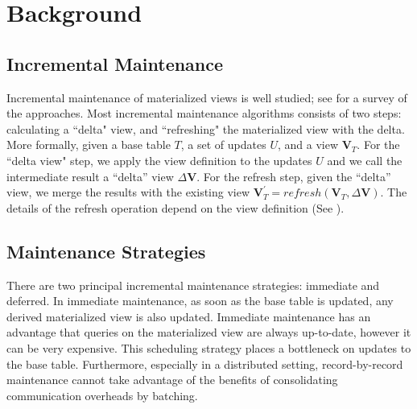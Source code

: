 \section{Background}\label{sec-background}
\vspace{-.5em}
\subsection{Incremental Maintenance}\label{subsec-inc}
Incremental maintenance of materialized views is well studied; see \cite{chirkova2011materialized} for a survey of the approaches. 
Most incremental maintenance algorithms consists of two steps: calculating a ``delta" view,
and ``refreshing" the materialized view with the delta.
More formally, given a base table $T$, a set of updates $U$,
and a view $\textbf{V}_{T}$.
For the ``delta view" step, we apply the view definition to the updates $U$ and we call
the intermediate result a ``delta'' view $\Delta\textbf{V}$.
For the refresh step, given the ``delta'' view, we merge the results with the existing
view $\textbf{V}_{T}^{'}=refresh(\textbf{V}_{T},\Delta\textbf{V})$.
The details of the refresh operation depend on the view definition
(See \cite{chirkova2011materialized}).



\subsection{Maintenance Strategies}
There are two principal incremental maintenance strategies: immediate and deferred. 
In immediate maintenance, as soon as the base table is updated, 
any derived materialized view is also updated.
Immediate maintenance has an advantage that queries on the materialized view are always up-to-date, 
however it can be very expensive.
This scheduling strategy places a bottleneck on updates to the base table.
Furthermore, especially in a distributed setting, record-by-record 
maintenance cannot take advantage of the benefits of consolidating communication overheads by batching.

